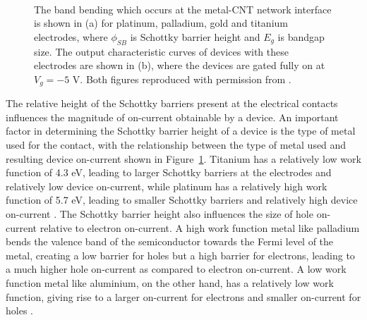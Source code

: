 \documentclass[
  a4paper,
]{scrbook}
\begin{document}
\begin{figure}
\begin{minipage}[t]{0.45\linewidth}
{{}

}

\end{minipage}%
%
\begin{minipage}[t]{0.01\linewidth}

{\centering 

~

}

\end{minipage}%

\caption[Figure which shows the band bending occurring at the metal-CNT
network interface with corresponding output characteristic
curves.]{\label{fig-band-bending}The band bending which occurs at the
metal-CNT network interface is shown in (a) for platinum, palladium,
gold and titanium electrodes, where \(\phi_{SB}\) is Schottky barrier
height and \(E_g\) is bandgap size. The output characteristic curves of
devices with these electrodes are shown in (b), where the devices are
gated fully on at \(V_g = -5\) V. Both figures reproduced with
permission from \autocite{Bargaoui2018}.}

\end{figure}

The relative height of the Schottky barriers present at the electrical
contacts influences the magnitude of on-current obtainable by a device.
An important factor in determining the Schottky barrier height of a
device is the type of metal used for the contact, with the relationship
between the type of metal used and resulting device on-current shown in
Figure~\ref{fig-band-bending}. Titanium has a relatively low work
function of 4.3 eV, leading to larger Schottky barriers at the
electrodes and relatively low device on-current, while platinum has a
relatively high work function of 5.7 eV, leading to smaller Schottky
barriers and relatively high device on-current \autocite{Bargaoui2018}.
The Schottky barrier height also influences the size of hole on-current
relative to electron on-current. A high work function metal like
palladium bends the valence band of the semiconductor towards the Fermi
level of the metal, creating a low barrier for holes but a high barrier
for electrons, leading to a much higher hole on-current as compared to
electron on-current. A low work function metal like aluminium, on the
other hand, has a relatively low work function, giving rise to a larger
on-current for electrons and smaller on-current for holes
\autocite{Chen2005,Avouris2007,Bargaoui2018}.
\end{document}
